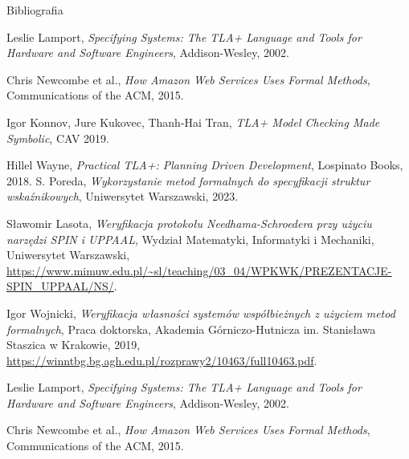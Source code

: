 \documentclass{purdue-poster}
\begin{document}
\begin{frame}{}
\begin{columns}[T]
\begin{column}{.48\linewidth}

    \begin{block}{\large Bibliografia}
        {\scriptsize 
        \begin{thebibliography}{00}
        \setlength{\itemsep}{0pt}
        \setlength{\parskip}{0pt} 
            Leslie Lamport, \emph{Specifying Systems: The TLA+ Language and Tools for Hardware and Software Engineers}, Addison-Wesley, 2002.
          
            Chris Newcombe et al., \emph{How Amazon Web Services Uses Formal Methods}, Communications of the ACM, 2015.
          
            Igor Konnov, Jure Kukovec, Thanh-Hai Tran, \emph{TLA+ Model Checking Made Symbolic}, CAV 2019.
          
            Hillel Wayne, \emph{Practical TLA+: Planning Driven Development}, Lospinato Books, 2018.
            S. Poreda,
            \textit{Wykorzystanie metod formalnych do specyfikacji struktur wskaźnikowych},
            Uniwersytet Warszawski, 2023.
        
            Sławomir Lasota,
            \textit{Weryfikacja protokołu Needhama-Schroedera przy użyciu narzędzi SPIN i UPPAAL},
            Wydział Matematyki, Informatyki i Mechaniki, Uniwersytet Warszawski,
            \url{https://www.mimuw.edu.pl/~sl/teaching/03_04/WPKWK/PREZENTACJE-SPIN_UPPAAL/NS/}.
        
            Igor Wojnicki,
            \textit{Weryfikacja własności systemów współbieżnych z użyciem metod formalnych},
            Praca doktorska, Akademia Górniczo-Hutnicza im. Stanisława Staszica w Krakowie, 2019,
            \url{https://winntbg.bg.agh.edu.pl/rozprawy2/10463/full10463.pdf}.

            Leslie Lamport, \emph{Specifying Systems: The TLA+ Language and Tools for Hardware and Software Engineers}, Addison-Wesley, 2002.
        
            Chris Newcombe et al., \emph{How Amazon Web Services Uses Formal Methods}, Communications of the ACM, 2015.
        

\end{thebibliography}}
\end{block}
\end{column}
\end{columns}
\end{frame}
\end{document}
